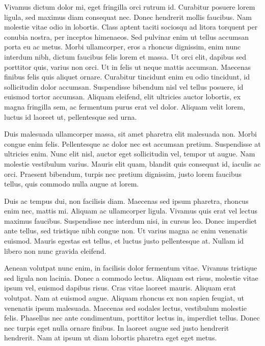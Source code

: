 Vivamus dictum dolor mi, eget fringilla orci rutrum id. Curabitur posuere lorem ligula, sed maximus diam consequat nec. Donec hendrerit mollis faucibus. Nam molestie vitae odio in lobortis. Class aptent taciti sociosqu ad litora torquent per conubia nostra, per inceptos himenaeos. Sed pulvinar enim ut tellus accumsan porta eu ac metus. Morbi ullamcorper, eros a rhoncus dignissim, enim nunc interdum nibh, dictum faucibus felis lorem et massa. Ut orci elit, dapibus sed porttitor quis, varius non orci. Ut in felis ut neque mattis accumsan. Maecenas finibus felis quis aliquet ornare. Curabitur tincidunt enim eu odio tincidunt, id sollicitudin dolor accumsan. Suspendisse bibendum nisl vel tellus posuere, id euismod tortor accumsan. Aliquam eleifend, elit ultricies auctor lobortis, ex magna fringilla sem, ac fermentum purus erat vel dolor. Aliquam velit lorem, luctus id laoreet ut, pellentesque sed urna.

Duis malesuada ullamcorper massa, sit amet pharetra elit malesuada non. Morbi congue enim felis. Pellentesque ac dolor nec est accumsan pretium. Suspendisse at ultricies enim. Nunc elit nisl, auctor eget sollicitudin vel, tempor ut augue. Nam molestie vestibulum varius. Mauris elit quam, blandit quis consequat id, iaculis ac orci. Praesent bibendum, turpis nec pretium dignissim, justo lorem faucibus tellus, quis commodo nulla augue at lorem.

Duis ac tempus dui, non facilisis diam. Maecenas sed ipsum pharetra, rhoncus enim nec, mattis mi. Aliquam ac ullamcorper ligula. Vivamus quis erat vel lectus maximus faucibus. Suspendisse nec interdum nisi, in cursus leo. Donec imperdiet ante tellus, sed tristique nibh congue non. Ut varius magna ac enim venenatis euismod. Mauris egestas est tellus, et luctus justo pellentesque at. Nullam id libero non nunc gravida eleifend.

Aenean volutpat nunc enim, in facilisis dolor fermentum vitae. Vivamus tristique sed ligula non lacinia. Donec a commodo lectus. Aliquam est risus, molestie vitae ipsum vel, euismod dapibus risus. Cras vitae laoreet mauris. Aliquam erat volutpat. Nam at euismod augue. Aliquam rhoncus ex non sapien feugiat, ut venenatis ipsum malesuada. Maecenas sed sodales lectus, vestibulum molestie felis. Phasellus nec ante condimentum, porttitor lectus in, imperdiet tellus. Donec nec turpis eget nulla ornare finibus. In laoreet augue sed justo hendrerit hendrerit. Nam at ipsum ut diam lobortis pharetra eget eget metus.

